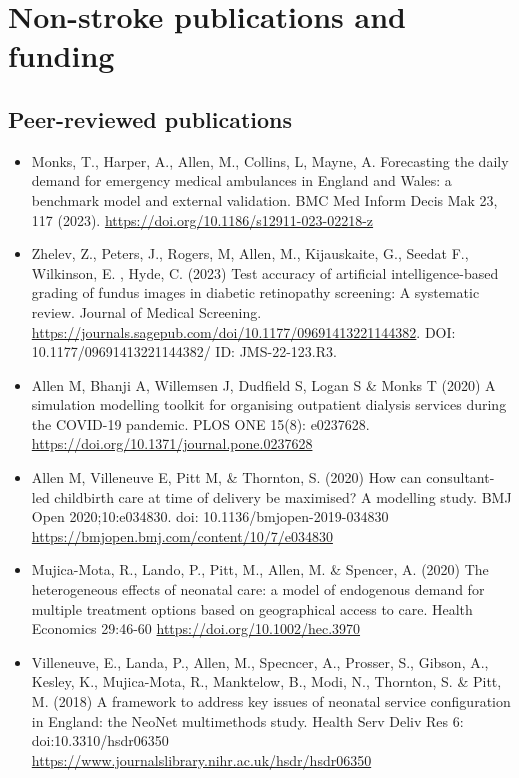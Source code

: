 
\section{Non-stroke publications and funding}

\subsection{Peer-reviewed publications}

\begin{itemize}
    \item Monks, T., Harper, A., Allen, M., Collins, L, Mayne, A. Forecasting the daily demand for emergency medical ambulances in England and Wales: a benchmark model and external validation. BMC Med Inform Decis Mak 23, 117 (2023). \url{https://doi.org/10.1186/s12911-023-02218-z}

    \item Zhelev, Z., Peters, J., Rogers, M, Allen, M., Kijauskaite, G., Seedat F., Wilkinson, E. , Hyde, C. (2023) Test accuracy of artificial intelligence-based grading of fundus images in diabetic retinopathy screening: A systematic review. Journal of Medical Screening. \url{https://journals.sagepub.com/doi/10.1177/09691413221144382}.  DOI: 10.1177/09691413221144382/ ID: JMS-22-123.R3. 

    \item Allen M, Bhanji A, Willemsen J, Dudfield S, Logan S \& Monks T (2020) A simulation modelling toolkit for organising outpatient dialysis services during the COVID-19 pandemic. PLOS ONE 15(8): e0237628. \url{https://doi.org/10.1371/journal.pone.0237628}

    \item Allen M, Villeneuve E, Pitt M, \& Thornton, S. (2020) How can consultant-led childbirth care at time of delivery be maximised? A modelling study. BMJ Open 2020;10:e034830. doi: 10.1136/bmjopen-2019-034830 \url{https://bmjopen.bmj.com/content/10/7/e034830}

    \item Mujica-Mota, R., Lando, P., Pitt, M., Allen, M. \& Spencer, A. (2020) The heterogeneous effects of neonatal care: a model of endogenous demand for multiple treatment options based on geographical access to care. Health Economics 29:46-60 \url{https://doi.org/10.1002/hec.3970}

    \item Villeneuve, E., Landa, P., Allen, M., Specncer, A., Prosser, S., Gibson, A., Kesley, K., Mujica-Mota, R., Manktelow, B., Modi, N., Thornton, S. \& Pitt, M. (2018) A framework to address key issues of neonatal service configuration in England: the NeoNet multimethods study. Health Serv Deliv Res 6: doi:10.3310/hsdr06350 \url{https://www.journalslibrary.nihr.ac.uk/hsdr/hsdr06350}


\end{itemize}
